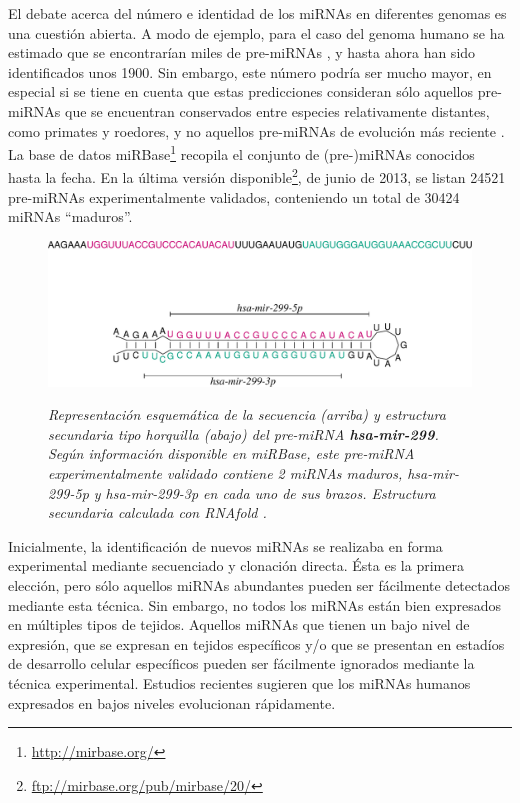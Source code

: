 \documentclass[12pt,bibliography=oldstyle,DIV=12,parskip=full-]{scrartcl}
\begin{document}
El debate acerca del número e identidad de los miRNAs en diferentes
genomas es una cuestión abierta. A modo de ejemplo, para el caso del
genoma humano se ha estimado que se encontrarían miles de pre-miRNAs
\cite{batuwita}, y hasta ahora han sido identificados unos 1900.  Sin
embargo, este número podría ser mucho mayor, en especial si se tiene
en cuenta que estas predicciones consideran sólo aquellos pre-miRNAs
que se encuentran conservados entre especies relativamente distantes,
como primates y roedores, y no aquellos pre-miRNAs de evolución más
reciente \cite{sewer}.  La base de datos
miRBase\footnote{\url{http://mirbase.org/}}
\cite{mirbase2}\cite{mirbase3} recopila el conjunto de (pre-)miRNAs
conocidos hasta la fecha. En la última versión
disponible\footnote{\url{ftp://mirbase.org/pub/mirbase/20/}}, de junio
de 2013, se listan 24521 pre-miRNAs experimentalmente validados,
conteniendo un total de 30424 miRNAs ``maduros''.
%
\begin{figure}
  \small\slshape\center
  \includegraphics[width=.9\textwidth]{img/hsa-mir-299_ss.pdf}
  \caption{\small\slshape Representación esquemática de la secuencia (arriba) y
    estructura secundaria tipo horquilla (abajo) del pre-miRNA
    \textbf{hsa-mir-299}. Según información disponible en miRBase,
    este pre-miRNA experimentalmente validado contiene 2 miRNAs
    maduros, hsa-mir-299-5p y hsa-mir-299-3p en cada uno de sus
    brazos. Estructura secundaria calculada con RNAfold
    \cite{vienna}.}
  \label{horquilla}
\end{figure}

Inicialmente, la identificación de nuevos miRNAs se realizaba en forma
experimental mediante secuenciado y clonación directa. Ésta es la
primera elección, pero sólo aquellos miRNAs abundantes pueden ser
fácilmente detectados mediante esta técnica. Sin embargo,
no todos los miRNAs están bien expresados en múltiples tipos de
tejidos. Aquellos miRNAs que tienen un bajo nivel de expresión, que se
expresan en tejidos específicos y/o que se presentan en estadíos de
desarrollo celular específicos pueden ser fácilmente ignorados
mediante la técnica experimental. Estudios recientes sugieren que los
miRNAs humanos expresados en bajos niveles evolucionan
rápidamente. \cite{ding}\cite{xu}
\end{document}

